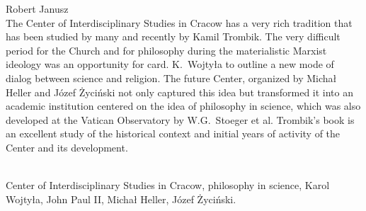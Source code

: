 \begin{newrevplenv}{Robert Janusz}
{}\\
{The Center of Interdisciplinary Studies in Cracow has a very rich tradition that has been studied by many and recently by Kamil Trombik. The very difficult period for the Church and for philosophy during the materialistic Marxist ideology was an opportunity for card. K.~Wojtyła to outline a new mode of dialog between science and religion. The future Center, organized by Michał Heller and Józef Życiński not only captured this idea but transformed it into an academic institution centered on the  idea of philosophy in science, which was also developed at the Vatican Observatory by W.G.~Stoeger et al. Trombik's book is an excellent study of the historical context and initial years of activity of the Center and its development.}\par%
\vspace{2mm}%
{}\\%
{Center of Interdisciplinary Studies in Cracow, philosophy in science, Karol Wojtyła, John Paul II, Michał Heller, Józef Życiński.}%


\end{newrevplenv}